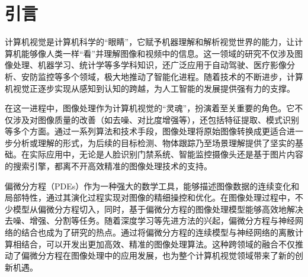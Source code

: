 \titleformat{\chapter}[hang]{\linespread{1}\heiti\sanhao\bfseries\filright}{\thechapter}{1em}{}{}
\chapter{引言}
计算机视觉是计算机科学的“眼睛”，它赋予机器理解和解析视觉世界的能力，让计算机能够像人类一样“看”并理解图像和视频中的信息。这一领域的研究不仅涉及图像处理、机器学习、统计学等多学科知识，还广泛应用于自动驾驶、医疗影像分析、安防监控等多个领域，极大地推动了智能化进程。随着技术的不断进步，计算机视觉正逐步实现从感知到认知的跨越，为人工智能的发展提供强有力的支撑。

在这一进程中，图像处理作为计算机视觉的“灵魂”，扮演着至关重要的角色。它不仅涉及对图像质量的改善（如去噪、对比度增强等），还包括特征提取、模式识别等多个方面。通过一系列算法和技术手段，图像处理将原始图像转换成更适合进一步分析或理解的形式，为后续的目标检测、物体跟踪乃至场景理解提供了坚实的基础。在实际应用中，无论是人脸识别门禁系统、智能监控摄像头还是基于图片内容的搜索引擎，都离不开高效精准的图像处理技术的支持。

偏微分方程（PDEs）作为一种强大的数学工具，能够描述图像数据的连续变化和局部特性，通过其演化过程实现对图像的精细操控和优化。在图像处理过程中，不少模型从偏微分方程切入，同时，基于偏微分方程的图像处理模型能够高效地解决去噪、增强、分割等任务。随着深度学习等先进方法的兴起，偏微分方程与神经网络的结合也成为了研究的热点。通过将偏微分方程的连续模型与神经网络的离散计算相结合，可以开发出更加高效、精准的图像处理算法。这种跨领域的融合不仅推动了偏微分方程在图像处理中的应用发展，也为整个计算机视觉领域带来了新的创新机遇。
